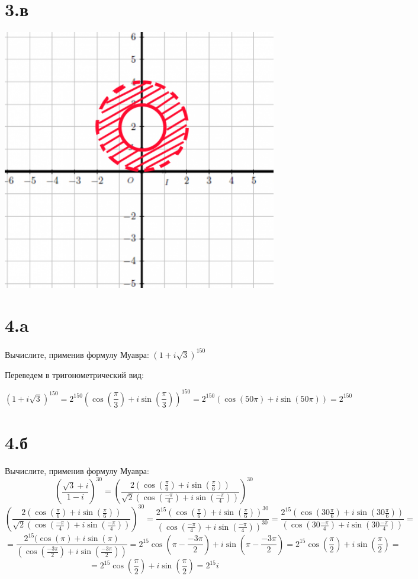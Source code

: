 \documentclass[a4paper]{article}
\begin{document}
\section*{3.в}
\includegraphics[width=12cm]{3}
\section*{4.a}
Вычислите, применив формулу Муавра: $(1 + i \sqrt{3})^{150}$

Переведем в тригонометрический вид:

$$(1 + i \sqrt{3})^{150} = 2^{150}(\cos(\frac{\pi}{3}) + i\sin(\frac{\pi}{3}))^{150} = 2^{150}(\cos(50\pi) + i\sin(50\pi)) = 2^{150}$$


\section*{4.б}

Вычислите, применив формулу Муавра:
$$(\frac{\sqrt{3} + i}{1 -i})^{30}=
(\frac{2(\cos(\frac{\pi}{6}) + i\sin(\frac{\pi}{6}))}{\sqrt{2}(\cos(\frac{-\pi}{4}) + i\sin(\frac{-\pi}{4}))})^{30} 
$$
$$
(\frac{2(\cos(\frac{\pi}{6}) + i\sin(\frac{\pi}{6}))}{\sqrt{2}(\cos(\frac{-\pi}{4}) + i\sin(\frac{-\pi}{4}))})^{30}  = \frac{2^{15}(\cos(\frac{\pi}{6}) + i\sin(\frac{\pi}{6}))^{30}}{(\cos(\frac{-\pi}{4}) + i\sin(\frac{-\pi}{4}))^{30}}=
\frac{2^{15}(\cos(30\frac{\pi}{6}) + i\sin(30\frac{\pi}{6}))}{(\cos(30\frac{-\pi}{4}) + i\sin(30\frac{-\pi}{4}))}
=$$
$$ 
=
\frac{2^{15}(\cos(\pi) + i\sin(\pi)}{(\cos(\frac{-3\pi}{2}) + i\sin(\frac{-3\pi}{2}))}=
2^{15}\cos(\pi - \frac{-3\pi}{2}) + i\sin(\pi - \frac{-3\pi}{2})=
2^{15}\cos(\frac{\pi}{2}) + i\sin(\frac{\pi}{2})=
$$
$$
= 2^{15}\cos(\frac{\pi}{2}) + i\sin(\frac{\pi}{2}) = 2^{15}i
$$
\end{document}

